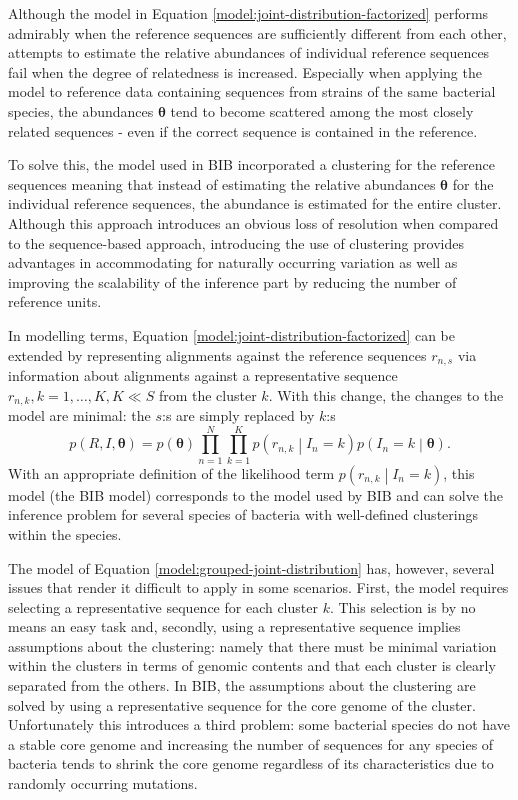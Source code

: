 \documentclass[officiallayout]{tktla}
\begin{document}
Although the model in Equation
\ref{model:joint-distribution-factorized} performs admirably when the
reference sequences are sufficiently different from each other,
attempts to estimate the relative abundances of individual reference
sequences fail when the degree of relatedness is increased. Especially
when applying the model to reference data containing sequences from
strains of the same bacterial species, the abundances
$\boldsymbol\theta$ tend to become scattered among the most closely
related sequences - even if the correct sequence is contained in the
reference.

To solve this, the model used in BIB incorporated a clustering for the
reference sequences \textemdash meaning that instead of estimating the
relative abundances $\boldsymbol\theta$ for the individual reference
sequences, the abundance is estimated for the entire cluster. Although
this approach introduces an obvious loss of resolution when compared
to the sequence-based approach, introducing the use of clustering
provides advantages in accommodating for naturally occurring variation
as well as improving the scalability of the inference part by reducing
the number of reference units.

In modelling terms, Equation \ref{model:joint-distribution-factorized}
can be extended by representing alignments against the reference
sequences $r_{n, s}$ via information about alignments against a
representative sequence $r_{n, k}, k = 1, \dots, K, K \ll S$ from the
cluster $k$. With this change, the changes to the model are minimal:
the $s$:s are simply replaced by $k$:s
\begin{equation}
  \label{model:grouped-joint-distribution}
  p\left(R, I, \boldsymbol\theta\right) = p\left(\boldsymbol\theta\right)\prod_{n = 1}^{N} \prod_{k = 1}^{K} p\left(r_{n, k} \middle| I_{n} = k\right) p\left(I_{n} = k \middle| \boldsymbol\theta\right).
\end{equation}
With an appropriate definition of the likelihood term $p\left(r_{n, k}
\middle| I_{n} = k\right)$, this model (the BIB model) corresponds
to the model used by BIB and can solve the inference problem for
several species of bacteria with well-defined clusterings within the
species.

The model of Equation \ref{model:grouped-joint-distribution} has,
however, several issues that render it difficult to apply in some
scenarios. First, the model requires selecting a representative
sequence for each cluster $k$. This selection is by no means an easy
task and, secondly, using a representative sequence implies assumptions
about the clustering: namely that there must be minimal variation
within the clusters in terms of genomic contents and that each cluster
is clearly separated from the others. In BIB, the assumptions about
the clustering are solved by using a representative sequence for the
core genome of the cluster. Unfortunately this introduces a third
problem: some bacterial species do not have a stable core genome and
increasing the number of sequences for any species of bacteria tends
to shrink the core genome regardless of its characteristics due to
randomly occurring mutations.
\end{document}
